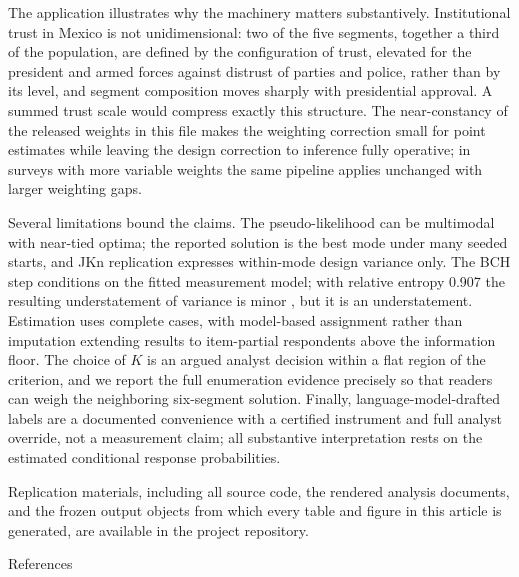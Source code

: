 \documentclass[
  12pt]{article}
\begin{document}
The application illustrates why the machinery matters substantively.
Institutional trust in Mexico is not unidimensional: two of the five
segments, together a third of the population, are defined by the
configuration of trust, elevated for the president and armed forces
against distrust of parties and police, rather than by its level, and
segment composition moves sharply with presidential approval. A summed
trust scale would compress exactly this structure. The near-constancy of
the released weights in this file makes the weighting correction small
for point estimates while leaving the design correction to inference
fully operative; in surveys with more variable weights the same pipeline
applies unchanged with larger weighting gaps.

Several limitations bound the claims. The pseudo-likelihood can be
multimodal with near-tied optima; the reported solution is the best mode
under many seeded starts, and JKn replication expresses within-mode
design variance only. The BCH step conditions on the fitted measurement
model; with relative entropy 0.907 the resulting understatement of
variance is minor \citep{bakk2014}, but it is an understatement.
Estimation uses complete cases, with model-based assignment rather than
imputation extending results to item-partial respondents above the
information floor. The choice of \(K\) is an argued analyst decision
within a flat region of the criterion, and we report the full
enumeration evidence precisely so that readers can weigh the neighboring
six-segment solution. Finally, language-model-drafted labels are a
documented convenience with a certified instrument and full analyst
override, not a measurement claim; all substantive interpretation rests
on the estimated conditional response probabilities.

Replication materials, including all source code, the rendered analysis
documents, and the frozen output objects from which every table and
figure in this article is generated, are available in the project
repository.

\newpage

References

\renewcommand{\bibsection}{}

\end{document}
